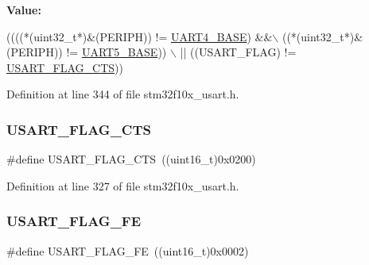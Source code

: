{\bfseries Value\+:}
\begin{DoxyCode}
((((*(uint32\_t*)&(PERIPH)) != \hyperlink{group___peripheral__memory__map_ga94d92270bf587ccdc3a37a5bb5d20467}{UART4\_BASE}) &&\(\backslash\)
                                                  ((*(uint32\_t*)&(PERIPH)) != 
      \hyperlink{group___peripheral__memory__map_gaa155689c0e206e6994951dc3cf31052a}{UART5\_BASE})) \(\backslash\)
                                                  || ((USART\_FLAG) != 
      \hyperlink{group___u_s_a_r_t___flags_ga94b7272319cca88a65075d5cb6048441}{USART\_FLAG\_CTS}))
\end{DoxyCode}


Definition at line 344 of file stm32f10x\+\_\+usart.\+h.

\mbox{\label{group___u_s_a_r_t___flags_ga94b7272319cca88a65075d5cb6048441}} 
\subsubsection{\texorpdfstring{U\+S\+A\+R\+T\+\_\+\+F\+L\+A\+G\+\_\+\+C\+TS}{USART\_FLAG\_CTS}}
{\footnotesize\ttfamily \#define U\+S\+A\+R\+T\+\_\+\+F\+L\+A\+G\+\_\+\+C\+TS~((uint16\+\_\+t)0x0200)}



Definition at line 327 of file stm32f10x\+\_\+usart.\+h.

\mbox{\label{group___u_s_a_r_t___flags_ga3551a32bac49a2ec040e5fdafcc9c4bd}} 
\subsubsection{\texorpdfstring{U\+S\+A\+R\+T\+\_\+\+F\+L\+A\+G\+\_\+\+FE}{USART\_FLAG\_FE}}
{\footnotesize\ttfamily \#define U\+S\+A\+R\+T\+\_\+\+F\+L\+A\+G\+\_\+\+FE~((uint16\+\_\+t)0x0002)}




